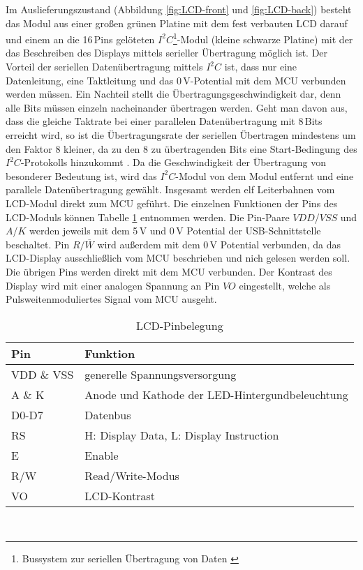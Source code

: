 Im Auslieferungszustand (Abbildung \ref{fig:LCD-front} und \ref{fig:LCD-back}) besteht das Modul aus einer großen grünen Platine mit dem fest verbauten LCD darauf und einem an die 16\,Pins gelöteten $I^2C$\footnote{Bussystem zur seriellen Übertragung von Daten \cite[s.61]{MCU_in_Practice}}-Modul (kleine schwarze Platine) mit der das Beschreiben des Displays mittels serieller Übertragung möglich ist. Der Vorteil der seriellen Datenübertragung mittels $I^2C$ ist, dass nur eine Datenleitung, eine Taktleitung und das 0\,V-Potential mit dem MCU verbunden werden müssen. Ein Nachteil stellt die Übertragungsgeschwindigkeit dar, denn alle Bits müssen einzeln nacheinander übertragen werden. Geht man davon aus, dass die gleiche Taktrate bei einer parallelen Datenübertragung mit 8\,Bits erreicht wird, so ist die Übertragungsrate der seriellen Übertragen mindestens um den Faktor 8 kleiner, da zu den 8 zu übertragenden Bits eine Start-Bedingung des $I^2C$-Protokolls hinzukommt \cite[s. 62]{MCU_in_Practice}. Da die Geschwindigkeit der Übertragung von besonderer Bedeutung ist, wird das $I^2C$-Modul von dem Modul entfernt und eine parallele Datenübertragung gewählt. Insgesamt werden elf Leiterbahnen vom LCD-Modul direkt zum MCU geführt. Die einzelnen Funktionen der Pins des LCD-Moduls können Tabelle \ref{tab:LCD_Pins} entnommen werden. Die Pin-Paare $VDD$/$VSS$ und $A$/$K$ werden jeweils mit dem 5\,V und 0\,V Potential der USB-Schnittstelle beschaltet. Pin $R/\overline{W}$ wird außerdem mit dem 0\,V Potential verbunden, da das LCD-Display ausschließlich vom MCU beschrieben und nich gelesen werden soll. Die übrigen Pins werden direkt mit dem MCU verbunden. Der Kontrast des Display wird mit einer analogen Spannung an Pin $VO$ eingestellt, welche als Pulsweitenmoduliertes Signal vom MCU ausgeht.
\begin{table}[h]
	\begin{center}
		\begin{tabular}{l | l}
			\textbf{Pin} & \textbf{Funktion}\\
			\hline
			VDD \& VSS & generelle Spannungsversorgung\\
			A \& K & Anode und Kathode der LED-Hintergundbeleuchtung\\
			D0-D7 & Datenbus\\
			RS & H: Display Data, L: Display Instruction\\
			E & Enable\\
			R/W & Read/Write-Modus\\
			VO & LCD-Kontrast\\
		\end{tabular}
	\caption{LCD-Pinbelegung \cite[s. 7]{LCD_MN}}
	\label{tab:LCD_Pins}
	\end{center}
\end{table}\\
